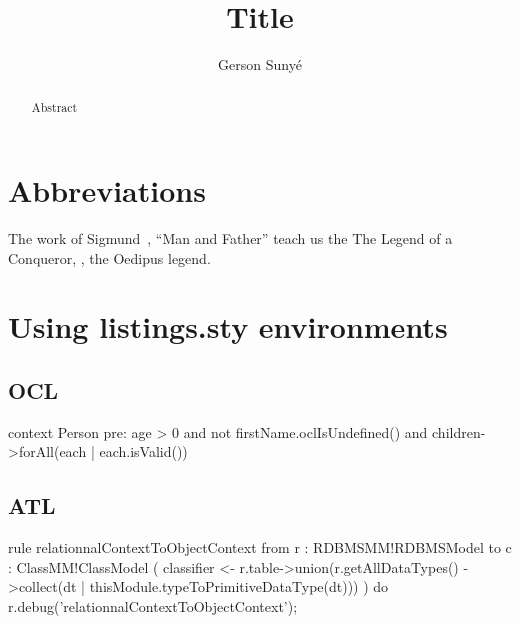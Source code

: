 \documentclass{article}
\title{Title}
\author{Gerson Sunyé}
\begin{document}
\maketitle

\begin{abstract}
    Abstract
\end{abstract}

\section{Abbreviations}

The work of Sigmund~\etal{}, \eg{} ``Man and Father'' teach us the The Legend of a Conqueror, \ie{}, the Oedipus legend.

\section{Using listings.sty environments}

\subsection{OCL}

\begin{ocl}
context Person
pre: 
	age > 0 and 
	not firstName.oclIsUndefined() and
	children->forAll(each | each.isValid())
\end{ocl}



\subsection{ATL}

\begin{atl}
rule relationnalContextToObjectContext {
	from
		r : RDBMSMM!RDBMSModel
	to
		c : ClassMM!ClassModel (
			classifier <- r.table->union(r.getAllDataTypes()
				->collect(dt | thisModule.typeToPrimitiveDataType(dt)))
		)
	do {
		r.debug('relationnalContextToObjectContext');
	}
}
\end{atl}
\end{document}
